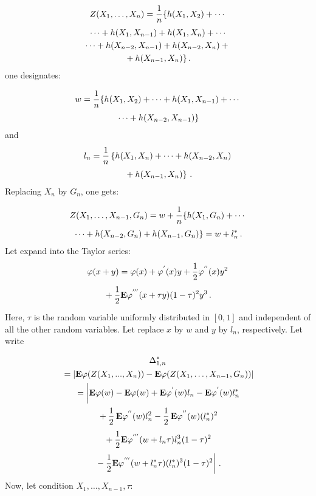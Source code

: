 \begin{multicols}{2}
\noindent
    \begin{multline*}
    Z(X_1,\ldots,X_n)=\displaystyle\frac{\displaystyle 1\mathstrut}{\displaystyle n\mathstrut}\{h(X_1,X_2)+\cdots{}\\
\cdots +h(X_1,X_{n-1})+h(X_1,X_n)+\cdots\\
\cdots+h(X_{n-2},X_{n-1})+h(X_{n-2},X_n)+{}\\
{}+h(X_{n-1},X_n)\}\,.
\end{multline*}
    one designates:
    
    \noindent
    \begin{multline*}
    w=\displaystyle\frac{\displaystyle 1\mathstrut}{\displaystyle n\mathstrut}\{h(X_1,X_2)+\cdots+h(X_1,X_{n-1})+
    \cdots{}\\
    {}\cdots +h(X_{n-2},X_{n-1})\}
    \end{multline*}
    and
    \begin{multline*}
    l_n=\displaystyle\frac{\displaystyle 1\mathstrut}{\displaystyle n\mathstrut}\left\{h(X_1,X_n)+\cdots+h(X_{n-2},X_n)\right.\\
\left.    {}+h(X_{n-1},X_n)\right\}\,.
    \end{multline*}
    Replacing $X_n$ by $G_n$, one gets:
    
    \noindent
    \begin{multline*}
    Z(X_1,\ldots,X_{n-1},G_n)=w+\displaystyle\frac{\displaystyle 1\mathstrut}{\displaystyle n\mathstrut}\{h(X_1,G_n)+\cdots{}\\
{}    \cdots+h(X_{n-2},G_n)+
    h(X_{n-1},G_n)\}
    {}= w+l_n^{*}\,.
    \end{multline*}
    Let expand into the Taylor series:
    \begin{multline*}
    \varphi(x+y)=\varphi(x)+\varphi^{'}(x)y+\displaystyle\frac{\displaystyle 1\mathstrut}{\displaystyle 2\mathstrut}\varphi^{''}(x)y^{2}\\
    {}+\displaystyle\frac{\displaystyle 1\mathstrut}{\displaystyle 2\mathstrut}
    \mathbf{E}\varphi^{'''}(x+\tau y)(1-\tau)^{2}y^3\,. 
    \end{multline*}
    Here, $\tau$ is the random
    variable uniformly distributed in $[0,1]$ and independent of
    all the other random variables. Let replace $x$ by $w$ and $y$ by $l_n$, respectively.
Let write

\noindent
     \begin{multline*}
    \Delta^{*}_{1,n}\\
    {}=\left\vert\mathbf{E}\varphi(Z(X_1,...,X_n))-
    \mathbf{E}\varphi(Z(X_1,\ldots,X_{n-1},G_n))\right\vert\\
    {}=
    \left\vert\vphantom{\fr{1}{2}}
    \mathbf{E}\varphi(w)-\mathbf{E}\varphi(w)+\mathbf{E}\varphi^{'}(w)l_n-
    \mathbf{E}\varphi^{'}(w)l_n^{*}\right.\\
    {}+
    \fr{1}{2}\,\mathbf{E}\varphi^{''}(w)l_n^2-
    \fr{1}{2}\,\mathbf{E}\varphi^{''}(w)(l_n^{*})^2\\
{}+
    \fr{1}{2}\mathbf{E}\varphi^{'''}(w+l_n\tau )l_n^3(1-\tau)^{2}\\
\left.    {}-
    \fr{1}{2}\mathbf{E}\varphi^{'''}(w+l_n^{*}\tau)(l_n^{*})^3(1-\tau)^{2}\right\vert\,.
    \end{multline*}
    Now, let condition $X_1,\ldots,X_{n-1},\tau$:
    

\end{multicols}
